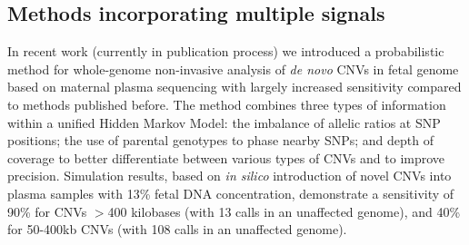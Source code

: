 \subsection{Methods incorporating multiple signals}
In recent work \citep{rampasek2014fcnv} (currently in publication process) we introduced a probabilistic method for whole-genome non-invasive analysis of \textit{de novo} CNVs in fetal genome based on maternal plasma sequencing with largely increased sensitivity compared to methods published before. The method combines three types of information within a unified Hidden Markov Model: the imbalance of allelic ratios at SNP positions; the use of parental genotypes to phase nearby SNPs; and depth of coverage to better differentiate between various types of CNVs and to improve precision. Simulation results, based on \emph{in silico} introduction of novel CNVs into plasma samples with 13\% fetal DNA concentration, demonstrate a sensitivity of 90\% for CNVs $>$400 kilobases (with 13 calls in an unaffected genome), and 40\% for 50-400kb CNVs (with 108 calls in an unaffected genome).